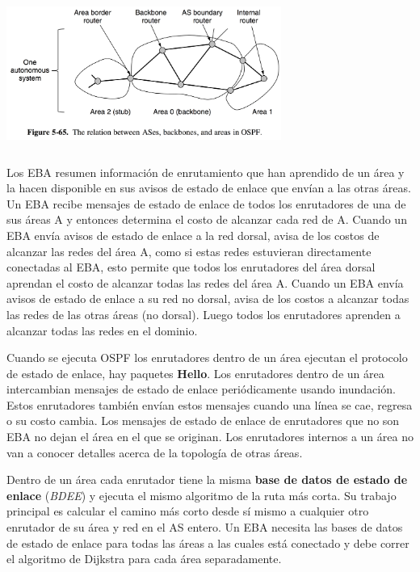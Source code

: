 \documentclass[10pt,a4paper]{report}
\begin{document}
	\begin{center}
			\includegraphics[width=9cm, height=5cm]{./imagenes/ospf2.png} 
		\end{center}
		
	\par Los EBA resumen información de enrutamiento que han aprendido de un área y la hacen disponible en sus avisos de estado de enlace que envían a las otras áreas. Un EBA recibe mensajes de estado de enlace de todos los enrutadores de una de sus áreas A y entonces determina el costo de alcanzar cada red de A. Cuando un EBA envía avisos de estado de enlace a la red dorsal, avisa de los costos de alcanzar las redes del área A, como si estas redes estuvieran directamente conectadas al EBA, esto permite que todos los enrutadores del área dorsal aprendan el costo de alcanzar todas las redes del área A. Cuando un EBA envía avisos de estado de enlace a su red no dorsal, avisa de los costos a alcanzar todas las redes de las otras áreas (no dorsal). Luego todos los enrutadores aprenden a alcanzar todas las redes en el dominio.
	
	\par Cuando se ejecuta OSPF los enrutadores dentro de un área ejecutan el protocolo de estado de enlace, hay paquetes \textbf{Hello}. Los enrutadores dentro de un área intercambian mensajes de estado de enlace periódicamente usando inundación. Estos enrutadores también envían estos mensajes cuando una línea se cae, regresa o su costo cambia. Los mensajes de estado de enlace de enrutadores que no son EBA no dejan el área en el que se originan. Los enrutadores internos a un área no van a conocer detalles acerca de la topología de otras áreas.

	\par Dentro de un área cada enrutador tiene la misma \textbf{base de datos de estado de enlace} (\textit{BDEE}) y ejecuta el mismo algoritmo de la ruta más corta. Su trabajo principal es calcular el camino más corto desde sí mismo a cualquier otro enrutador de su área y red en el AS entero. Un EBA necesita las bases de datos de estado de enlace para todas las áreas a las cuales está conectado y debe correr el algoritmo de Dijkstra para cada área separadamente.
\end{document}

